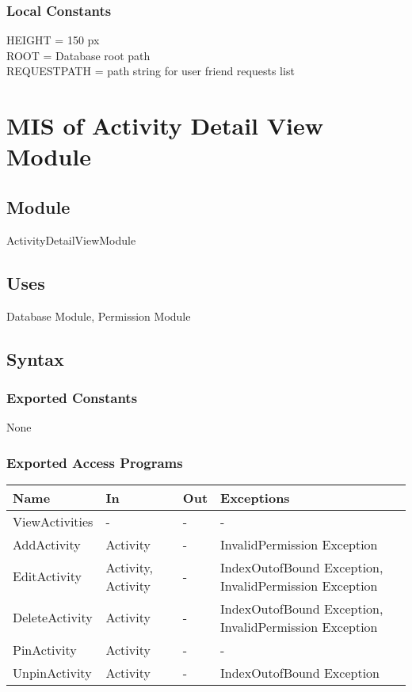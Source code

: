 \documentclass[12pt, titlepage]{article}
\begin{document}
\subsubsection{Local Constants}
HEIGHT = 150 px\\
ROOT = Database root path\\
REQUESTPATH = path string for user friend requests list

\newpage

\section{MIS of Activity Detail View Module} \label{mADV}

\subsection{Module}

ActivityDetailViewModule

\subsection{Uses}

Database Module, Permission Module

\subsection{Syntax}

\subsubsection{Exported Constants}

None

\subsubsection{Exported Access Programs}
\begin{center}
\begin{tabular}{p{4cm} p{2cm} p{4cm} p{4cm}}
\hline
\textbf{Name} & \textbf{In} & \textbf{Out} & \textbf{Exceptions} \\
\hline
ViewActivities & - & - & - \\
AddActivity & Activity & - & InvalidPermission Exception \\
EditActivity & Activity, Activity & - & IndexOutofBound Exception, InvalidPermission Exception \\
DeleteActivity & Activity & - & IndexOutofBound Exception, InvalidPermission Exception \\
PinActivity & Activity & - & - \\
UnpinActivity & Activity & - & IndexOutofBound Exception \\
\hline
\end{tabular}
\end{center}
\end{document}
